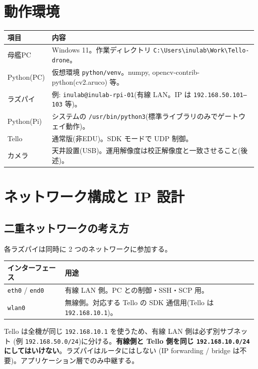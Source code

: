 \documentclass[11pt,a4paper]{ltjsarticle}
\newcommand{\code}[1]{\texttt{\small #1}}
\begin{document}
\section{動作環境}
\begin{longtable}{@{}p{4.2cm}p{11cm}@{}}
\toprule
\textbf{項目} & \textbf{内容} \\
\midrule
\endhead
母艦PC & Windows 11。作業ディレクトリ \code{C:\textbackslash Users\textbackslash inulab\textbackslash Work\textbackslash Tello-drone}。\\
Python(PC) & 仮想環境 \code{python/venv}。numpy, opencv-contrib-python(cv2.aruco) 等。\\
ラズパイ & 例: \code{inulab@inulab-rpi-01}(有線 LAN。IP は \code{192.168.50.101\textrm{--}103} 等)。\\
Python(Pi) & システムの \code{/usr/bin/python3}(標準ライブラリのみでゲートウェイ動作)。\\
Tello & 通常版(非EDU)。SDK モードで UDP 制御。\\
カメラ & 天井設置(USB)。運用解像度は校正解像度と一致させること(後述)。\\
\bottomrule
\end{longtable}

\section{ネットワーク構成と IP 設計}

\subsection{二重ネットワークの考え方}
各ラズパイは同時に 2 つのネットワークに参加する。

\begin{longtable}{@{}p{3.4cm}p{11.6cm}@{}}
\toprule
\textbf{インターフェース} & \textbf{用途} \\
\midrule
\endhead
\code{eth0} / \code{end0} & 有線 LAN 側。PC との制御・SSH・SCP 用。\\
\code{wlan0} & 無線側。対応する Tello の SDK 通信用(Tello は \code{192.168.10.1})。\\
\bottomrule
\end{longtable}

Tello は全機が同じ \code{192.168.10.1} を使うため、有線 LAN 側は必ず別サブネット
(例 \code{192.168.50.0/24})に分ける。\textbf{有線側と Tello 側を同じ
\code{192.168.10.0/24} にしてはいけない}。ラズパイはルータにはしない
(IP forwarding / bridge は不要)。アプリケーション層でのみ中継する。
\end{document}
